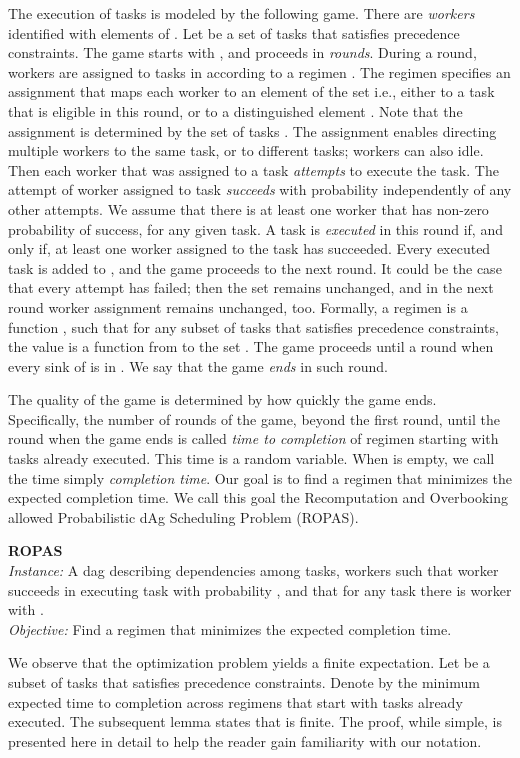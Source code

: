 \documentclass[letterpaper,11pt]{article}
\newcommand{\FF}{\vspace*{\medskipamount}}
\begin{document}
The execution of tasks is modeled by the following game.
There are  {\em workers} identified with elements of . Let  be a set of tasks that satisfies precedence constraints. The game starts with , and proceeds in {\em rounds}. During a round, workers are assigned to tasks in  according to a regimen . The regimen specifies an assignment  that maps each worker to an element of the set  i.e., either to a task that is eligible in this round, or to a distinguished element . Note that the assignment is determined by the set of tasks . The assignment enables directing multiple workers to the same task, or to different tasks; workers can also idle. 
Then each worker that was assigned to a task {\em attempts} to execute the task.
The attempt of worker  assigned to task  {\em succeeds} with probability  independently of any other attempts. We assume that there is at least one worker that has non-zero probability of success, for any given task. A task is {\em executed} in this round if, and only if, at least one worker assigned to the task has succeeded. Every executed task is added to , and the game proceeds to the next round. It could be the case that every attempt has failed; then the set  remains unchanged, and in the next round worker assignment remains unchanged, too.
Formally, a regimen  is a function , such that for any subset  of tasks that satisfies precedence constraints, the value  is a function from  to the set .
The game proceeds until a round when every sink of  is in . We say that the game {\em ends} in such round.

The quality of the game is determined by how quickly the game ends. Specifically, the number of rounds of the game, beyond the first round, until the round when the game ends is called {\em time to completion} of regimen  starting with tasks  already executed. This time is a random variable. When  is empty, we call the time simply {\em completion time}.
Our goal is to find a regimen  that minimizes the expected completion time. We call this goal the Recomputation and Overbooking allowed Probabilistic dAg Scheduling Problem (ROPAS).

\FF
\noindent
{\bf ROPAS}\\
{\it Instance:} A dag  describing dependencies among  tasks,  workers such that worker  succeeds in executing task  with probability , and that for any task  there is worker  with .\\
{\it Objective:} Find a regimen  that minimizes the expected completion time.
\FF

We observe that the optimization problem yields a finite expectation.
Let  be a subset of tasks that satisfies precedence constraints. Denote by  the minimum expected time to completion across regimens that start with tasks  already executed. 
The subsequent lemma states that  is finite. 
The proof, while simple, is presented here in detail to help the reader gain familiarity with our notation. 
\end{document}
